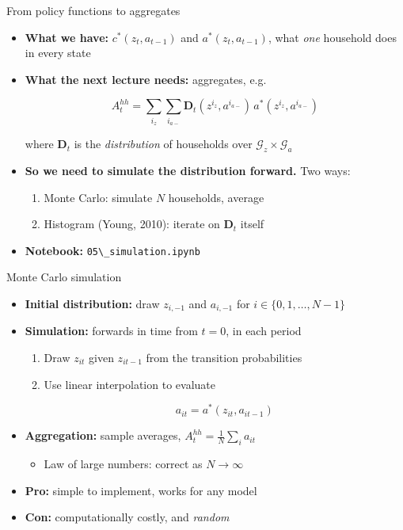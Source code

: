 \documentclass[
  10pt,
  ignorenonframetext,
  aspectratio=43,
  english,
  handout]{beamer}
\providecommand{\tightlist}{%
  \setlength{\itemsep}{0pt}\setlength{\parskip}{0pt}}
\begin{document}
\begin{frame}[fragile]{From policy functions to aggregates}
\protect{}\label{from-policy-functions-to-aggregates}
\begin{itemize}
\item
  \textbf{What we have:} \(c^{\ast}(z_{t},a_{t-1})\) and
  \(a^{\ast}(z_{t},a_{t-1})\), what \emph{one} household does in every
  state
\item
  \textbf{What the next lecture needs:} aggregates, e.g.\vspace{-1mm}

  \[
    A^{hh}_{t}=\sum_{i_{z}}\sum_{i_{a-}}\boldsymbol{D}_{t}(z^{i_{z}},a^{i_{a-}})\,a^{\ast}(z^{i_{z}},a^{i_{a-}})
    \]

  where \(\boldsymbol{D}_{t}\) is the \emph{distribution} of households
  over \(\mathcal{G}_{z}\times\mathcal{G}_{a}\)
\item
  \textbf{So we need to simulate the distribution forward.} Two ways:

  \begin{enumerate}
  \tightlist
  \item
    Monte Carlo: simulate \(N\) households, average
  \item
    Histogram (Young, 2010): iterate on \(\boldsymbol{D}_{t}\) itself
  \end{enumerate}
\item
  \textbf{Notebook:} \texttt{05\textbackslash{}\_simulation.ipynb}
\end{itemize}
\end{frame}

\begin{frame}{Monte Carlo simulation}
\protect{}\label{monte-carlo-simulation}
\begin{itemize}
\tightlist
\item
  \textbf{Initial distribution:} draw \(z_{i,-1}\) and \(a_{i,-1}\) for
  \(i\in\{0,1,\dots,N-1\}\)
\item
  \textbf{Simulation:} forwards in time from \(t=0\), in each period

  \begin{enumerate}
  \item
    Draw \(z_{it}\) given \(z_{it-1}\) from the transition probabilities
  \item
    Use linear interpolation to evaluate\vspace{-1mm}

    \[
     a_{it}=a^{\ast}(z_{it},a_{it-1})
     \]
  \end{enumerate}
\item
  \textbf{Aggregation:} sample averages,
  \(A^{hh}_{t}=\frac{1}{N}\sum_{i}a_{it}\)

  \begin{itemize}
  \tightlist
  \item
    Law of large numbers: correct as \(N\rightarrow\infty\)
  \end{itemize}
\item
  \textbf{Pro:} simple to implement, works for any model
\item
  \textbf{Con:} computationally costly, and \emph{random}
\end{itemize}
\end{frame}
\end{document}
